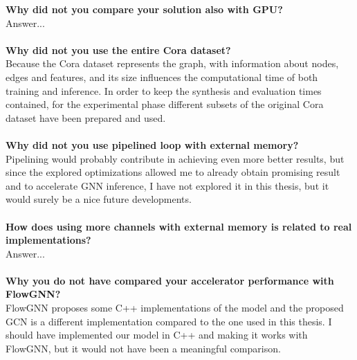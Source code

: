 \documentclass{article}
\begin{document}
\textbf{Why did not you compare your solution also with GPU?} \\
\noindent
Answer...
\\
\\
\noindent
\textbf{Why did not you use the entire Cora dataset?} \\
\noindent
Because the Cora dataset represents the graph, with information about nodes, edges and features, and its size influences the computational time of both training and inference.
In order to keep the synthesis and evaluation times contained, for the experimental phase different subsets of the original Cora dataset have been prepared and used.
\\
\\
\noindent
\textbf{Why did not you use pipelined loop with external memory?} \\
\noindent
Pipelining would probably contribute in achieving even more better results, but since the explored optimizations allowed me to already obtain promising result and to accelerate GNN inference, I have not explored it in this thesis, but it would surely be a nice future developments.
\\
\\
\noindent
\textbf{How does using more channels with external memory is related to real implementations?} \\
\noindent
Answer...
\\
\\
\noindent
\textbf{Why you do not have compared your accelerator performance with FlowGNN?} \\
\noindent
FlowGNN proposes some C++ implementations of the model and the proposed GCN is a different implementation compared to the one used in this thesis. I should have implemented our model in C++ and making it works with FlowGNN, but it would not have been a meaningful comparison.
\\
\\
\noindent
\end{document}

